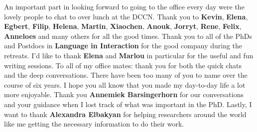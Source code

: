 An important part in looking forward to going to the office every day were the lovely people to chat to over lunch at the DCCN. Thank you to \textbf{Kevin}, \textbf{Elena}, \textbf{Egbert}, \textbf{Filip}, \textbf{Helena}, \textbf{Martin}, \textbf{Xiaochen}, \textbf{Anouk}, \textbf{Jorryt}, \textbf{Rene}, \textbf{Felix}, \textbf{Anneloes} and many others for all the good times. \newline
Thank you to all of the PhDs and Postdocs in \textbf{Language in Interaction} for the good company during the retreats. I'd like to thank \textbf{Elena} and \textbf{Marlou} in particular for the useful and fun writing sessions. \newline
To all of my office mates: thank you for both the quick chats and the deep conversations. There have been too many of you to name over the course of six years. I hope you all know that you made my day-to-day life a lot more enjoyable. \newline
Thank you \textbf{Annemiek Barsingerhorn} for our conversations and your guidance when I lost track of what was important in the PhD. \newline
Lastly, I want to thank \textbf{Alexandra Elbakyan} for helping researchers around the world like me getting the necessary information to do their work. 

